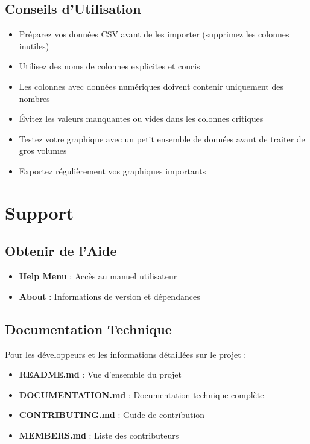 \documentclass[11pt, a4paper]{article}
\begin{document}
\subsection{Conseils d'Utilisation}

\begin{itemize}
    \item Préparez vos données CSV avant de les importer (supprimez les colonnes inutiles)
    \item Utilisez des noms de colonnes explicites et concis
    \item Les colonnes avec données numériques doivent contenir uniquement des nombres
    \item Évitez les valeurs manquantes ou vides dans les colonnes critiques
    \item Testez votre graphique avec un petit ensemble de données avant de traiter de gros volumes
    \item Exportez régulièrement vos graphiques importants
\end{itemize}

\section{Support}

\subsection{Obtenir de l'Aide}
\begin{itemize}
    \item \textbf{Help Menu} : Accès au manuel utilisateur
    \item \textbf{About} : Informations de version et dépendances
\end{itemize}

\subsection{Documentation Technique}
Pour les développeurs et les informations détaillées sur le projet :

\begin{itemize}
    \item \textbf{README.md} : Vue d'ensemble du projet
    \item \textbf{DOCUMENTATION.md} : Documentation technique complète
    \item \textbf{CONTRIBUTING.md} : Guide de contribution
    \item \textbf{MEMBERS.md} : Liste des contributeurs
\end{itemize}
\end{document}
